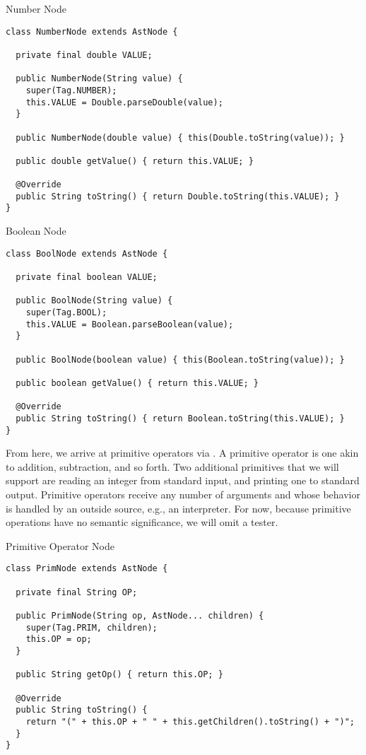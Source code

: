 \begin{cl}{Number Node}
\begin{lstlisting}[language=MyJava]
class NumberNode extends AstNode {

  private final double VALUE;

  public NumberNode(String value) {
    super(Tag.NUMBER);
    this.VALUE = Double.parseDouble(value);
  }

  public NumberNode(double value) { this(Double.toString(value)); }

  public double getValue() { return this.VALUE; }

  @Override
  public String toString() { return Double.toString(this.VALUE); }
}
\end{lstlisting}
\end{cl}

\begin{cl}{Boolean Node}
\begin{lstlisting}[language=MyJava]
class BoolNode extends AstNode {

  private final boolean VALUE;

  public BoolNode(String value) {
    super(Tag.BOOL);
    this.VALUE = Boolean.parseBoolean(value);
  }

  public BoolNode(boolean value) { this(Boolean.toString(value)); }

  public boolean getValue() { return this.VALUE; }

  @Override
  public String toString() { return Boolean.toString(this.VALUE); }
}
\end{lstlisting}
\end{cl}

From here, we arrive at primitive operators via . A primitive operator is one akin to addition, subtraction, and so forth. Two additional primitives that we will support are reading an integer from standard input, and printing one to standard output. Primitive operators receive any number of arguments and whose behavior is handled by an outside source, e.g., an interpreter. For now, because primitive operations have no semantic significance, we will omit a tester.

\begin{cl}{Primitive Operator Node}
\begin{lstlisting}[language=MyJava]
class PrimNode extends AstNode {

  private final String OP;

  public PrimNode(String op, AstNode... children) {
    super(Tag.PRIM, children);
    this.OP = op;
  }

  public String getOp() { return this.OP; }

  @Override
  public String toString() {
    return "(" + this.OP + " " + this.getChildren().toString() + ")";
  }
}
\end{lstlisting}
\end{cl}

